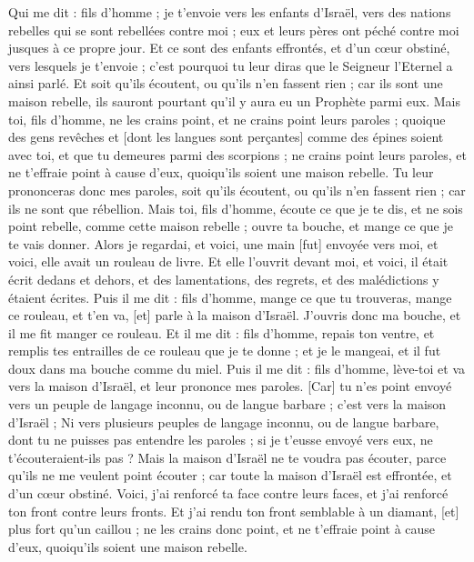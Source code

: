 \begin{multicols}{2}
Qui me dit : fils d'homme ; je t'envoie vers les enfants d'Israël, vers des nations rebelles qui se sont rebellées contre moi ; eux et leurs pères ont péché contre moi jusques à ce propre jour.
Et ce sont des enfants effrontés, et d'un cœur obstiné, vers lesquels je t'envoie ; c'est pourquoi tu leur diras que le Seigneur l'Eternel a ainsi parlé.
Et soit qu'ils écoutent, ou qu'ils n'en fassent rien ; car ils sont une maison rebelle, ils sauront pourtant qu'il y aura eu un Prophète parmi eux.
Mais toi, fils d'homme, ne les crains point, et ne crains point leurs paroles ; quoique des gens revêches et [dont les langues sont perçantes] comme des épines soient avec toi, et que tu demeures parmi des scorpions ; ne crains point leurs paroles, et ne t'effraie point à cause d'eux, quoiqu'ils soient une maison rebelle.
Tu leur prononceras donc mes paroles, soit qu'ils écoutent, ou qu'ils n'en fassent rien ; car ils ne sont que rébellion.
Mais toi, fils d'homme, écoute ce que je te dis, et ne sois point rebelle, comme cette maison rebelle ; ouvre ta bouche, et mange ce que je te vais donner.
Alors je regardai, et voici, une main [fut] envoyée vers moi, et voici, elle avait un rouleau de livre.
Et elle l'ouvrit devant moi, et voici, il était écrit dedans et dehors, et des lamentations, des regrets, et des malédictions y étaient écrites.
\VerseOne{}Puis il me dit : fils d'homme, mange ce que tu trouveras, mange ce rouleau, et t'en va, [et] parle à la maison d'Israël.
J'ouvris donc ma bouche, et il me fit manger ce rouleau.
Et il me dit : fils d'homme, repais ton ventre, et remplis tes entrailles de ce rouleau que je te donne ; et je le mangeai, et il fut doux dans ma bouche comme du miel.
Puis il me dit : fils d'homme, lève-toi et va vers la maison d'Israël, et leur prononce mes paroles.
[Car] tu n'es point envoyé vers un peuple de langage inconnu, ou de langue barbare ; c'est vers la maison d'Israël ;
Ni vers plusieurs peuples de langage inconnu, ou de langue barbare, dont tu ne puisses pas entendre les paroles ; si je t'eusse envoyé vers eux, ne t'écouteraient-ils pas ?
Mais la maison d'Israël ne te voudra pas écouter, parce qu'ils ne me veulent point écouter ; car toute la maison d'Israël est effrontée, et d'un cœur obstiné.
Voici, j'ai renforcé ta face contre leurs faces, et j'ai renforcé ton front contre leurs fronts.
Et j'ai rendu ton front semblable à un diamant, [et] plus fort qu'un caillou ; ne les crains donc point, et ne t'effraie point à cause d'eux, quoiqu'ils soient une maison rebelle.

\end{multicols}
